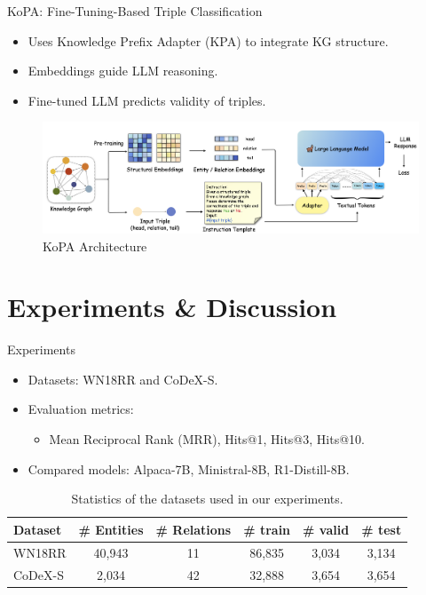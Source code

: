 \documentclass[aspectratio=169,xcolor=dvipsnames]{beamer}
\begin{document}
\begin{frame}{KoPA: Fine-Tuning-Based Triple Classification}
    \begin{itemize}
        \item Uses Knowledge Prefix Adapter (KPA) to integrate KG structure.
        \item Embeddings guide LLM reasoning.
        \item Fine-tuned LLM predicts validity of triples.
    \end{itemize}
    \begin{figure}[h]
        \centering
        \includegraphics[width=0.8\linewidth]{images/KoPAarchitecture.png}
        \caption{KoPA Architecture}
    \end{figure}
\end{frame}


\section{Experiments \& Discussion}
\begin{frame}{Experiments}
    \begin{itemize}
        \item Datasets: WN18RR and CoDeX-S.
        \item Evaluation metrics:
              \begin{itemize}
                  \item Mean Reciprocal Rank (MRR), Hits@1, Hits@3, Hits@10.
              \end{itemize}
        \item Compared models: Alpaca-7B, Ministral-8B, R1-Distill-8B.
    \end{itemize}
    \begin{table}[h]
        \centering
        \begin{tabular}{l c c c c c}
            \toprule
            \textbf{Dataset} & \textbf{\# Entities} & \textbf{\# Relations} & \textbf{\# train} & \textbf{\# valid} & \textbf{\# test} \\
            \midrule
            WN18RR           & 40,943               & 11                    & 86,835            & 3,034             & 3,134            \\
            CoDeX-S          & 2,034                & 42                    & 32,888            & 3,654             & 3,654            \\
            \bottomrule
        \end{tabular}
        \caption{Statistics of the datasets used in our experiments.}
        \label{tab:datasets}
    \end{table}
\end{frame}
\end{document}

